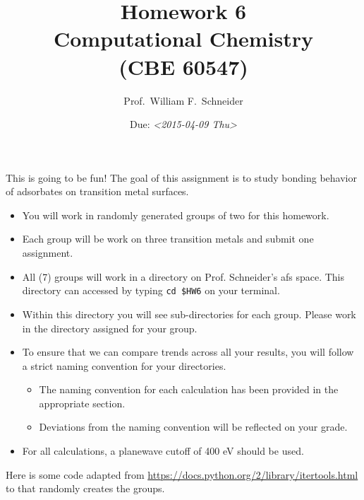\documentclass[11pt]{article}
\date{Due: \textit{<2015-04-09 Thu>}}
\title{}
\begin{document}
\title{Homework 6\\Computational Chemistry\\(CBE 60547)}
\author{Prof.\ William F.\ Schneider}
\maketitle

This is going to be fun! The goal of this assignment is to study bonding behavior of adsorbates on transition metal surfaces.

\begin{itemize}
\item You will work in randomly generated groups of two for this homework.

\item Each group will be work on three transition metals and submit one assignment.

\item All (7) groups will work in a directory on Prof. Schneider's afs space. This directory can accessed by typing \verb~cd $HW6~ on your terminal.

\item Within this directory you will see sub-directories for each group. Please work in the directory assigned for your group.

\item To ensure that we can compare trends across all your results, you will follow a strict naming convention for your directories. 
\begin{itemize}
\item The naming convention for each calculation has been provided in the appropriate section.
\item Deviations from the naming convention will be reflected on your grade.
\end{itemize}

\item For all calculations, a planewave cutoff of 400 eV should be used.
\end{itemize}

Here is some code adapted from \url{https://docs.python.org/2/library/itertools.html} to that randomly creates the groups.
\end{document}
